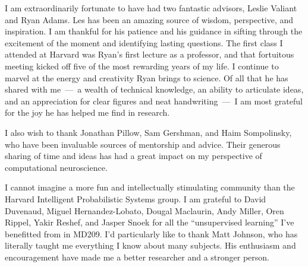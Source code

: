 
\vspace{-1em}
I am extraordinarily fortunate to have had two fantastic advisors, Leslie Valiant and Ryan Adams.
Les has been an amazing source of
wisdom, perspective, and inspiration. I am thankful for
his patience and his guidance in sifting through
the excitement of the moment and identifying lasting
questions. 
The first class I attended at Harvard was Ryan's first lecture as a professor,
and that fortuitous meeting kicked off five of the most
rewarding years of my life.
I continue to marvel at the energy and creativity Ryan brings to science.
Of all that he has shared with me~---~a wealth of technical knowledge,
an ability to articulate ideas, and an appreciation for
clear figures and neat handwriting~---~I am most grateful for the joy he has helped me find in research.

I also wish to thank Jonathan Pillow, Sam Gershman, and Haim
Sompolinsky, who have been invaluable sources of mentorship and
advice.  Their generous sharing of time and ideas has had a great
impact on my perspective of computational neuroscience.



I cannot imagine a more fun and intellectually stimulating community
than the Harvard Intelligent Probabilistic Systems group.  I am
grateful to David Duvenaud, Miguel Hernandez-Lobato, Dougal Maclaurin,
Andy Miller, Oren Rippel, Yakir Reshef, and Jasper Snoek for all the
``unsupervised learning'' I've benefitted from in MD209.
I'd particularly like to thank Matt Johnson, who has literally taught
me everything I know about many subjects.  His enthusiasm and
encouragement have made me a better researcher and a stronger person.

